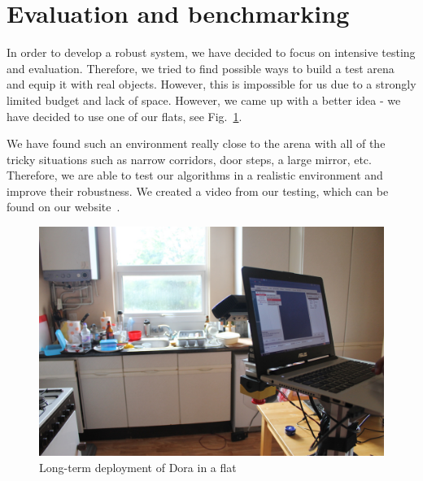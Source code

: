 \section{Evaluation and benchmarking}

In order to develop a robust system, we have decided to focus on intensive testing and evaluation. 
Therefore, we tried to find possible ways to build a test arena and equip it with real objects.
However, this is impossible for us due to a strongly limited budget and lack of space. 
However, we came up with a better idea - we have decided to use one of our flats, see Fig.~\ref{fig:kitchen}.

We have found such an environment really close to the arena with all of the tricky situations such as narrow corridors, door steps, a large mirror, etc. 
Therefore, we are able to test our algorithms in a realistic environment and improve their robustness.
We created a video from our testing, which can be found on our website~\cite{barc_web}. 

\begin{figure}[!htb]
\centering
\includegraphics[width=3.in]{kitchen.JPG}
\caption{Long-term deployment of Dora in a flat}
\label{fig:kitchen}
\end{figure}  
